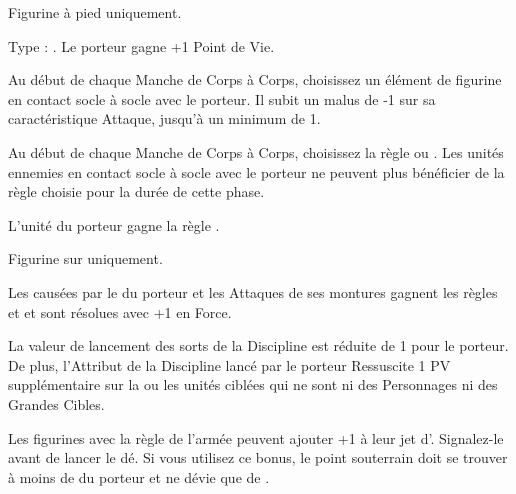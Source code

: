 Figurine à pied uniquement.

Type : \platearmour{}. Le porteur gagne +1 Point de Vie.

\endpricelist

\armytalismans

\startpricelist

 Au début de chaque Manche de Corps à Corps, choisissez un élément de figurine en contact socle à socle avec le porteur. Il subit un malus de -1 sur sa caractéristique Attaque, jusqu'à un minimum de 1.

\endpricelist

\armyenchanteditems

\startpricelist

 Au début de chaque Manche de Corps à Corps, choisissez la règle \inspiringpresence{} ou \holdyourground{}. Les unités ennemies en contact socle à socle avec le porteur ne peuvent plus bénéficier de la règle choisie pour la durée de cette phase.

 L'unité du porteur gagne la règle \hardtarget{}.

 Figurine sur \chariot{} uniquement.

Les \impacthits{} causées par le \chariot{} du porteur et les Attaques de ses montures gagnent les règles \flamingattacks{} et \magicalattacks{} et sont résolues avec +1 en Force.

\endpricelist

\armyarcaneitems

\startpricelist

 La valeur de lancement des sorts de la Discipline \sands{} est réduite de 1 pour le porteur. De plus, l'Attribut de la Discipline \sands{} lancé par le porteur Ressuscite 1 PV supplémentaire sur la ou les unités ciblées qui ne sont ni des Personnages ni des Grandes Cibles.

\endpricelist

\armymagicalbanners

\startpricelist

 Les figurines avec la règle \undergroundambush{} de l'armée peuvent ajouter +1 à leur jet d'\ambush{}. Signalez-le avant de lancer le dé. Si vous utilisez ce bonus, le point souterrain doit se trouver à moins de  du porteur et ne dévie que de .

